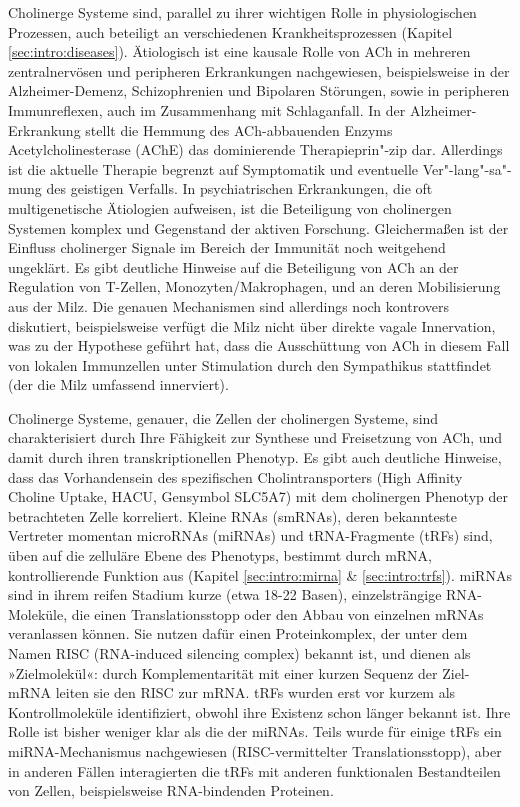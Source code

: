 Cholinerge Systeme sind, parallel zu ihrer wichtigen Rolle in physiologischen Prozessen, auch beteiligt an verschiedenen Krankheitsprozessen (Kapitel \ref{sec:intro:diseases}). Ätiologisch ist eine kausale Rolle von ACh in mehreren zentralnervösen und peripheren Erkrankungen nachgewiesen, beispielsweise in der Alzheimer-Demenz, Schizophrenien und Bipolaren Störungen, sowie in peripheren Immunreflexen, auch im Zusammenhang mit Schlaganfall. In der Alzheimer-Erkrankung stellt die Hemmung des ACh-abbauenden Enzyms Acetylcholinesterase (AChE) das dominierende Therapieprin"-zip dar. Allerdings ist die aktuelle Therapie begrenzt auf Symptomatik und eventuelle Ver"-lang"-sa"-mung des geistigen Verfalls. In psychiatrischen Erkrankungen, die oft multigenetische Ätiologien aufweisen, ist die Beteiligung von cholinergen Systemen komplex und Gegenstand der aktiven Forschung. Gleichermaßen ist der Einfluss cholinerger Signale im Bereich der Immunität noch weitgehend ungeklärt. Es gibt deutliche Hinweise auf die Beteiligung von ACh an der Regulation von T-Zellen, Monozyten/Makrophagen, und an deren Mobilisierung aus der Milz. Die genauen Mechanismen sind allerdings noch kontrovers diskutiert, beispielsweise verfügt die Milz nicht über direkte vagale Innervation, was zu der Hypothese geführt hat, dass die Ausschüttung von ACh in diesem Fall von lokalen Immunzellen unter Stimulation durch den Sympathikus stattfindet (der die Milz umfassend innerviert).

Cholinerge Systeme, genauer, die Zellen der cholinergen Systeme, sind charakterisiert durch Ihre Fähigkeit zur Synthese und Freisetzung von ACh, und damit durch ihren transkriptionellen Phenotyp. Es gibt auch deutliche Hinweise, dass das Vorhandensein des spezifischen Cholintransporters (High Affinity Choline Uptake, HACU, Gensymbol SLC5A7) mit dem cholinergen Phenotyp der betrachteten Zelle korreliert. Kleine RNAs (smRNAs), deren bekannteste Vertreter momentan microRNAs (miRNAs) und tRNA-Fragmente (tRFs) sind, üben auf die zelluläre Ebene des Phenotyps, bestimmt durch mRNA, kontrollierende Funktion aus (Kapitel \ref{sec:intro:mirna} \& \ref{sec:intro:trfs}). miRNAs sind in ihrem reifen Stadium kurze (etwa 18-22 Basen), einzelsträngige RNA-Moleküle, die einen Translationsstopp oder den Abbau von einzelnen mRNAs veranlassen können. Sie nutzen dafür einen Proteinkomplex, der unter dem Namen RISC (RNA-induced silencing complex) bekannt ist, und dienen als »Zielmolekül«: durch Komplementarität mit einer kurzen Sequenz der Ziel-mRNA leiten sie den RISC zur mRNA. tRFs wurden erst vor kurzem als Kontrollmoleküle identifiziert, obwohl ihre Existenz schon länger bekannt ist. Ihre Rolle ist bisher weniger klar als die der miRNAs. Teils wurde für einige tRFs ein miRNA-Mechanismus nachgewiesen (RISC-vermittelter Translationsstopp), aber in anderen Fällen interagierten die tRFs mit anderen funktionalen Bestandteilen von Zellen, beispielsweise RNA-bindenden Proteinen.

